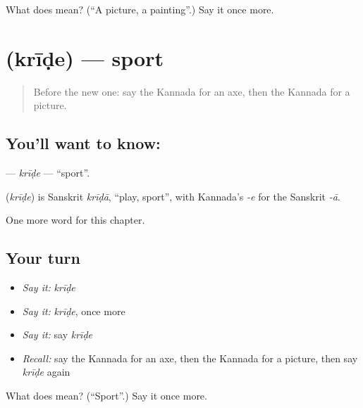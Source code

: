 \begin{tcolorbox}[breakable,colback=teal!4,colframe=teal!35!black,title={Before you move on}]
What does  mean? (\textquotedblleft{}A picture, a painting\textquotedblright{}.) Say it once more.
\end{tcolorbox}
\section[\texorpdfstring{\kn{ಕ್ರೀಡೆ} (krīḍe)}{ಕ್ರೀಡೆ (krīḍe)}]{ (krīḍe) — sport}

\label{lesson:KA-C191-kride}



\begin{quote}
Before the new one: say the Kannada for an axe, then the Kannada for a picture.
\end{quote}

\subsection*{You'll want to know: }
\textbf{} — \emph{krīḍe} — \textquotedblleft{}sport\textquotedblright{}.

\begin{cousinweb}
\textbf{} (\emph{krīḍe}) is Sanskrit \emph{krīḍā}, \textquotedblleft{}play, sport\textquotedblright{}, with Kannada's \emph{-e} for the Sanskrit \emph{-ā}.
\end{cousinweb}

\begin{grammarlens}[title={What you've built}]
One more word for this chapter.
\end{grammarlens}

\subsection*{Your turn}
\begin{itemize}
\raggedright
  \item \emph{Say it:} \emph{krīḍe}
  \item \emph{Say it:} \emph{krīḍe}, once more
  \item \emph{Say it:} say \emph{krīḍe}
  \item \emph{Recall:} say the Kannada for an axe, then the Kannada for a picture, then say \emph{krīḍe} again
\end{itemize}

\begin{tcolorbox}[breakable,colback=teal!4,colframe=teal!35!black,title={Before you move on}]
What does  mean? (\textquotedblleft{}Sport\textquotedblright{}.) Say it once more.
\end{tcolorbox}
